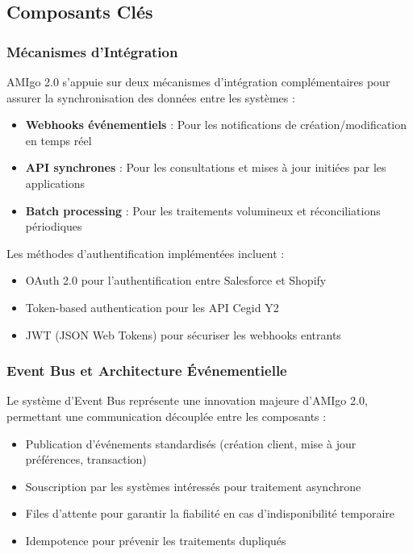 \subsection{Composants Clés}

\subsubsection{Mécanismes d'Intégration}

AMIgo 2.0 s'appuie sur deux mécanismes d'intégration complémentaires pour assurer la synchronisation des données entre les systèmes :

\begin{itemize}
    \item \textbf{Webhooks événementiels} : Pour les notifications de création/modification en temps réel
    \item \textbf{API synchrones} : Pour les consultations et mises à jour initiées par les applications
    \item \textbf{Batch processing} : Pour les traitements volumineux et réconciliations périodiques
\end{itemize}

Les méthodes d'authentification implémentées incluent :
\begin{itemize}
    \item OAuth 2.0 pour l'authentification entre Salesforce et Shopify
    \item Token-based authentication pour les API Cegid Y2
    \item JWT (JSON Web Tokens) pour sécuriser les webhooks entrants
\end{itemize}

\subsubsection{Event Bus et Architecture Événementielle}

Le système d'Event Bus représente une innovation majeure d'AMIgo 2.0, permettant une communication découplée entre les composants :

\begin{itemize}
    \item Publication d'événements standardisés (création client, mise à jour préférences, transaction)
    \item Souscription par les systèmes intéressés pour traitement asynchrone
    \item Files d'attente pour garantir la fiabilité en cas d'indisponibilité temporaire
    \item Idempotence pour prévenir les traitements dupliqués
\end{itemize}

